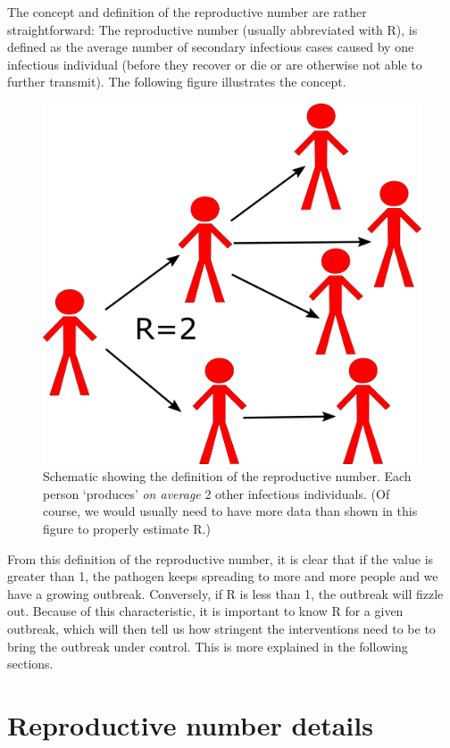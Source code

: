 \documentclass[]{book}
\theoremstyle{definition}
\theoremstyle{definition}
\theoremstyle{definition}
\theoremstyle{remark}
\begin{document}
The concept and definition of the reproductive number are rather
straightforward: The reproductive number (usually abbreviated with R),
is defined as the average number of secondary infectious cases caused by
one infectious individual (before they recover or die or are otherwise
not able to further transmit). The following figure illustrates the
concept.

\begin{figure}
\centering
\includegraphics{./images/R0scheme.png}
\caption{Schematic showing the definition of the reproductive number.
Each person `produces' \emph{on average} 2 other infectious individuals.
(Of course, we would usually need to have more data than shown in this
figure to properly estimate R.)}
\end{figure}

From this definition of the reproductive number, it is clear that if the
value is greater than 1, the pathogen keeps spreading to more and more
people and we have a growing outbreak. Conversely, if R is less than 1,
the outbreak will fizzle out. Because of this characteristic, it is
important to know R for a given outbreak, which will then tell us how
stringent the interventions need to be to bring the outbreak under
control. This is more explained in the following sections.

\hypertarget{reproductive-number-details}{%
\section{Reproductive number
details}\label{reproductive-number-details}}
\end{document}
